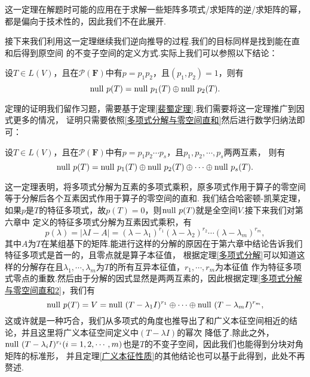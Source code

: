 这一定理在解题时可能的应用在于求解一些矩阵多项式/求矩阵的逆/求矩阵的幂，都是偏向于技术性的，因此我们不在此展开.

接下来我们利用这一定理继续我们逆向推导的过程.我们的目标同样是找到能在直和后得到原空间
的不变子空间的定义方式.实际上我们可以参照以下结论：
\begin{theorem}\label{多项式分解与零空间直和}
	设$T\in L(V)$，且在$\mathcal{P}(\mathbf{F})$中有$p=p_1p_2$，且$(p_1,p_2)=1$，则有
	$$\textup{null }p(T)=\textup{null }p_1(T)\oplus\textup{null }p_2(T).$$
\end{theorem}
定理的证明我们留作习题，需要基于定理\ref{裴蜀定理}.我们需要将这一定理推广到因式更多的情况，
证明只需要依照\ref{多项式分解与零空间直和}然后进行数学归纳法即可：
\begin{theorem}\label{多项式分解与零空间直和2}
	设$T\in L(V)$，且在$\mathcal{P}(\mathbf{F})$中有$p=p_1p_2\cdots p_s$，且$p_1,p_2,\cdots,p_s$两两互素，
	则有$$\textup{null }p(T)=\textup{null }p_1(T)\oplus\textup{null }p_2(T)\oplus\cdots\oplus\textup{null }p_s(T).$$
\end{theorem}
这一定理表明，将多项式分解为互素的多项式乘积，原多项式作用于算子的零空间等于分解后各个互素因式作用于算子的零空间的直和.
我们结合哈密顿-凯莱定理，如果$p$是$T$的特征多项式，故$p(T)=0$，则$\textup{null }p(T)$就是全空间$V$.接下来我们对第六章中
定义的特征多项式分解为互素因式乘积，有
$$p(\lambda)=|\lambda I-A|=(\lambda-\lambda_1)^{r_1}(\lambda-\lambda_2)^{r_2}\cdots(\lambda-\lambda_m)^{r_m},$$
其中$A$为$T$在某组基下的矩阵.能进行这样的分解的原因在于第六章中结论告诉我们特征多项式是首一的，且零点就是算子本征值，
根据定理\ref{多项式分解}可以知道这样的分解存在且$\lambda_1,\cdots,\lambda_m$为$T$的所有互异本征值，$r_1,\cdots,r_m$为本征值
作为特征多项式零点的重数.然后由于分解的因式显然是两两互素的，因此根据定理\ref{多项式分解与零空间直和2}，我们有
$$\textup{null }p(T)=V=\textup{null }(T-\lambda_1I)^{r_1}\oplus\cdots\oplus\textup{null }(T-\lambda_mI)^{r_m},$$
这或许就是一种巧合，我们从多项式的角度也推导出了和广义本征空间相近的结论，并且这里将广义本征空间定义中$(T-\lambda I)$的幂次
降低了.除此之外，$\textup{null }(T-\lambda_iI)^{r_i}(i=1,2,\cdots,m)$也是$T$的不变子空间，因此我们也能得到分块对角矩阵的标准形，
并且定理\ref{广义本征性质}的其他结论也可以基于此得到，此处不再赘述.

